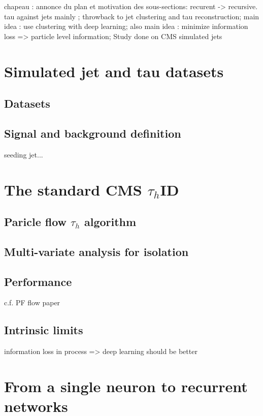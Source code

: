 chapeau : annonce du plan et motivation des sous-sections: recurent -> recursive.
tau against jets mainly ; throwback to jet clustering and tau reconstruction; main idea : use clustering with deep learning; also main idea : minimize information loss => particle level information; Study done on CMS simulated jets

\section{Simulated jet and tau datasets}

\subsection{Datasets}

\subsection{Signal and background definition}

seeding jet...

\section{The standard CMS $\tau_{h}$ID}

\subsection{Paricle flow $\tau_{h}$ algorithm}

\subsection{Multi-variate analysis for isolation}

\subsection{Performance}

c.f. PF flow paper

\subsection{Intrinsic limits}

information loss in process => deep learning should be better

\section{From a single neuron to recurrent networks}

